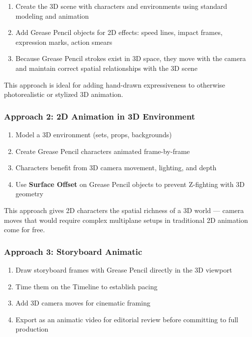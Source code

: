 \begin{enumerate}[leftmargin=2em]
  \item Create the 3D scene with characters and environments using standard modeling and animation
  \item Add Grease Pencil objects for 2D effects: speed lines, impact frames, expression marks, action smears
  \item Because Grease Pencil strokes exist in 3D space, they move with the camera and maintain correct spatial relationships with the 3D scene
\end{enumerate}

This approach is ideal for adding hand-drawn expressiveness to otherwise photorealistic or stylized 3D animation.

\subsubsection{Approach 2: 2D Animation in 3D Environment}

\begin{enumerate}[leftmargin=2em]
  \item Model a 3D environment (sets, props, backgrounds)
  \item Create Grease Pencil characters animated frame-by-frame
  \item Characters benefit from 3D camera movement, lighting, and depth
  \item Use \textbf{Surface Offset} on Grease Pencil objects to prevent Z-fighting with 3D geometry
\end{enumerate}

This approach gives 2D characters the spatial richness of a 3D world --- camera moves that would require complex multiplane setups in traditional 2D animation come for free.

\subsubsection{Approach 3: Storyboard Animatic}

\begin{enumerate}[leftmargin=2em]
  \item Draw storyboard frames with Grease Pencil directly in the 3D viewport
  \item Time them on the Timeline to establish pacing
  \item Add 3D camera moves for cinematic framing
  \item Export as an animatic video for editorial review before committing to full production
\end{enumerate}


